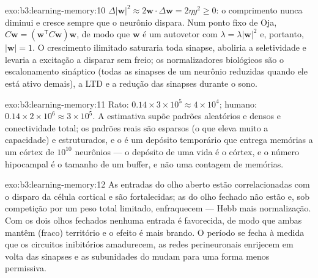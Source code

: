 \begin{solution}{exo:b3:learning-memory:10}
$\Delta|\mathbf{w}|^{2} \approx 2\mathbf{w}\cdot\Delta\mathbf{w} = 2\eta
y^{2} \ge 0$: o comprimento nunca diminui e cresce sempre que o neurônio
dispara. Num ponto fixo de Oja, $C\mathbf{w} = (\mathbf{w}^{\mathsf{T}}C
\mathbf{w})\mathbf{w}$, de modo que $\mathbf{w}$ é um autovetor com
$\lambda =
\lambda|\mathbf{w}|^{2}$ e, portanto, $|\mathbf{w}| = 1$. O
crescimento ilimitado saturaria toda sinapse, aboliria a seletividade e
levaria a excitação a disparar sem freio; os normalizadores biológicos
são o escalonamento sináptico (todas as sinapses de um neurônio
reduzidas quando ele está ativo demais), a LTD e a redução das sinapses
durante o sono.
\end{solution}

\begin{solution}{exo:b3:learning-memory:11}
Rato: $0.14\times 3\times 10^{5} \approx 4\times 10^{4}$; humano: $0.14
\times 2\times 10^{6} \approx 3\times 10^{5}$. A estimativa supõe padrões
aleatórios e densos e conectividade total; os padrões reais são esparsos
(o que eleva muito a capacidade) e estruturados, e o  é um
depósito temporário que entrega memórias a um córtex de $10^{10}$
neurônios --- o depósito de uma vida é o córtex, e o número hipocampal é
o tamanho de um buffer, e não uma contagem de memórias.
\end{solution}

\begin{solution}{exo:b3:learning-memory:12}
As entradas do olho aberto estão correlacionadas com o disparo da célula
cortical e são fortalecidas; as do olho fechado não estão e, sob
competição por um peso total limitado, enfraquecem --- Hebb mais
normalização. Com os dois olhos fechados nenhuma entrada é favorecida, de
modo que ambas mantêm (fraco) território e o efeito é mais brando. O
período se fecha à medida que os circuitos inibitórios amadurecem, as
redes perineuronais enrijecem em volta das sinapses e as subunidades do
 mudam para uma forma menos permissiva.
\end{solution}

